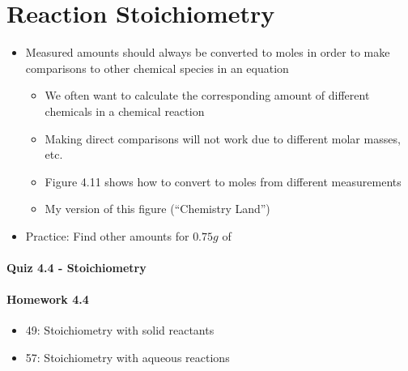 \documentclass[12pt, openany, letterpaper]{memoir}
\begin{document}
\section{Reaction Stoichiometry}
\begin{itemize}
  \item Measured amounts should always be converted to moles in order to make comparisons to other chemical species in an equation
    \begin{itemize}
      \item We often want to calculate the corresponding amount of different chemicals in a chemical reaction
      \item Making direct comparisons will not work due to different molar masses, etc.
      \item Figure 4.11 shows how to convert to moles from different measurements
      \item My version of this figure (``Chemistry Land'')
    \end{itemize}
  \item Practice:  Find other amounts for $0.75g$ of 
\end{itemize}

\paragraph*{Quiz 4.4 - Stoichiometry}
\paragraph*{Homework 4.4}
\begin{itemize}
  \item 49: Stoichiometry with solid reactants
  \item 57: Stoichiometry with aqueous reactions
\end{itemize}
\end{document}
